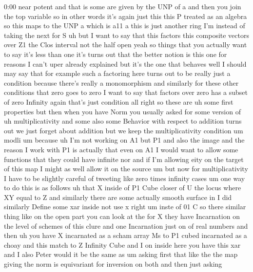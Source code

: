 \begin{unfinished}{0:00}
near  potent  and  that  is  some  are  given
by  the
UNP  of  a  and  then  you  join  the  top
variable  so  in  other  words  it's  again
just  this  this  P  treated  as  an
algebra  so  this  maps  to  the
UNP
a  which  is
a11  a  this  is  just
another
ring  I'm  instead  of  taking  the  next  for
S  uh  but  I  want  to  say  that  this  factors
this  composite
vectors  over
Z1  the  Clos  interval  not  the  half
open  yeah  so  things  that  you  actually
want  to  say  it's  less  than
one  it's  turns  out  that  the  better
notion  is  this  one  for  reasons  I  can't
uper  already  explained  but  it's  the  one
that  behaves
well  I  should  may  say  that  for  example
such  a  factoring  here  turns  out  to  be
really  just  a  condition  because  there's
really  a
monomorphism
and  similarly  for  these  other  conditions
that  zero  goes  to  zero  I  want  to  say
that  factors  over  zero  has  a  subset  of
zero  Infinity  again  that's  just
condition  all  right  so  these
are  uh  some  first  properties  but  then
when  you  have  Norm  you  usually
asked  for  some  version
of  uh  multiplicativity  and  some  also
some  Behavior  with  respect  to  addition
turns  out  we  just  forget  about  addition
but  we  keep  the  multiplicativity
condition
um
modli  um
because  uh  I'm  not  working  on  A1  but  P1
and  also  the  image  and  the  reason  I  work
with  P1  is  actually  that  even  on  A1  I
would  want  to  allow  some  functions  that
they  could  have  infinite
nor  and  if  I'm  allowing  eity  on  the
target  of  this  map  I  might  as  well  allow
it  on  the
source  um  but  now  for  multiplicativity  I
have  to  be  slightly  careful  of  tweeting
like  zero  times  infinity  cases  um  one
way  to  do  this  is  as  follows
uh  that  X  inside  of  P1
Cube  closer
of
U  the  locus  where  XY  equal  to
Z  and
similarly  there  are  some  actually  smooth
surface  in  I  did  similarly
Define  some  xar
inside  not  use  x  right  um  inste  of  01
C  so  there  similar  thing  like  on  the
open  part  you  can  look  at  the  for
X  they  have  Incarnation  on  the  level  of
schemes  of  this  clure  and  one
Incarnation  just  on
of  real
numbers  and
then  uh  you  have  X  incarnated  as  a  scham
array  Ms  to  P1
cubed  incarnated  as  a
choay  and  this  match  to  Z  Infinity
Cube  and  I  on  inside  here  you  have  this
xar  and  I
also  Peter  would  it  be  the  same  as  um
asking  first  that  like  the  the  map
giving  the  norm  is  equivariant  for
inversion  on  both  and  then  just  asking

\end{unfinished}
